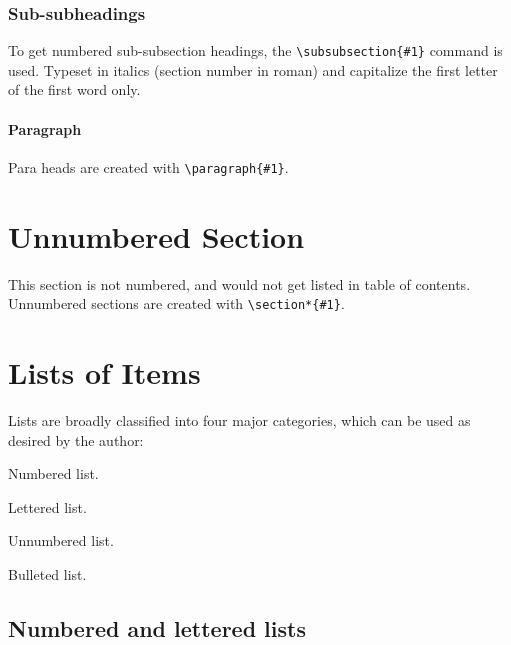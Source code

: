 \subsubsection{Sub-subheadings}
To get numbered sub-subsection headings, the
\verb|\subsubsection{#1}| command is used. Typeset in italics
(section number in roman) and capitalize the first letter of the
first word only.

\paragraph{Paragraph} Para heads are created with \verb|\paragraph{#1}|.

\section*{Unnumbered Section}
This section is not numbered, and would not get listed in table of contents.
Unnumbered sections are created with \verb|\section*{#1}|.

\section{Lists of Items}
Lists are broadly classified into four major categories, which can be
used as desired by the author:

\begin{alphlist}[(d)]
\item Numbered list.
\item Lettered list.
\item Unnumbered list.
\item Bulleted list.
\end{alphlist}

\subsection{Numbered and lettered lists}

